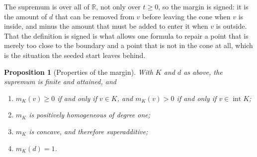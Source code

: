 \documentclass[a4paper,11pt]{book}
\theoremstyle{plain}
\newtheorem{proposition}[theorem]{Proposition}
\theoremstyle{definition}
\theoremstyle{remark}
\numberwithin{equation}{chapter}
\numberwithin{algorithm}{chapter}
\newcommand{\R}{\mathbb{R}}
\newcommand{\intr}{\operatorname{int}}
\begin{document}
	The supremum is over all of $\R$, not only over $t\geq0$, so the margin is
	signed: it is the amount of $d$ that can be removed from $v$ before leaving
	the cone when $v$ is inside, and minus the amount that must be added to enter
	it when $v$ is outside. That the definition is signed is what allows one
	formula to repair a point that is merely too close to the boundary and a
	point that is not in the cone at all, which is the situation the seeded start
	leaves behind.

	\begin{proposition}[Properties of the margin]\label{prop:marginprop}
		With $K$ and $d$ as above, the supremum is finite and attained, and
		\begin{enumerate}[label=(\roman*)]
			\item $m_K(v)\geq0$ if and only if $v\in K$, and $m_K(v)>0$ if and only
			if $v\in\intr K$;
			\item $m_K$ is positively homogeneous of degree one;
			\item $m_K$ is concave, and therefore superadditive;
			\item $m_K(d)=1$.
		\end{enumerate}
	\end{proposition}
\end{document}
